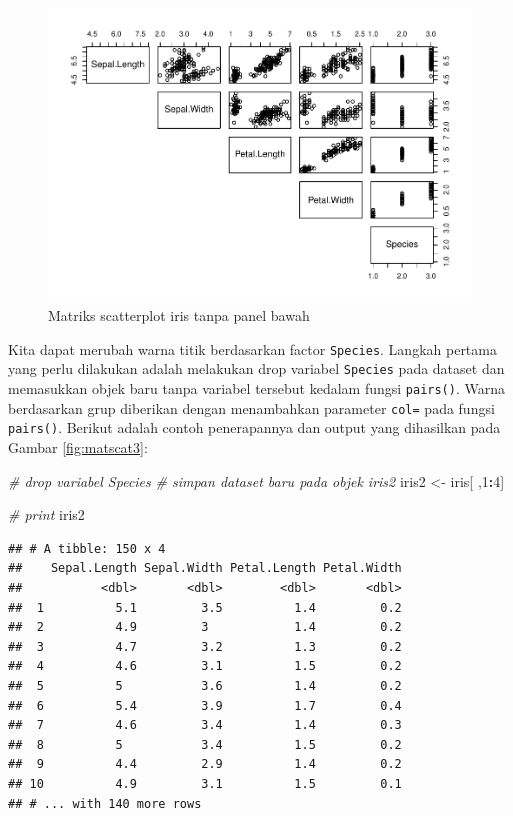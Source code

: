 \documentclass[]{book}
\newenvironment{Shaded}{\begin{snugshade}}{\end{snugshade}}
\newcommand{\DecValTok}[1]{\textcolor[rgb]{0.00,0.00,0.81}{#1}}
\newcommand{\StringTok}[1]{\textcolor[rgb]{0.31,0.60,0.02}{#1}}
\newcommand{\CommentTok}[1]{\textcolor[rgb]{0.56,0.35,0.01}{\textit{#1}}}
\newcommand{\OperatorTok}[1]{\textcolor[rgb]{0.81,0.36,0.00}{\textbf{#1}}}
\newcommand{\NormalTok}[1]{#1}
\begin{document}
\begin{figure}

{\centering \includegraphics[width=0.8\linewidth]{EnvStat_files/figure-latex/matscat2-1} 

}

\caption{Matriks scatterplot iris tanpa panel bawah}\label{fig:matscat2}
\end{figure}

Kita dapat merubah warna titik berdasarkan factor \texttt{Species}.
Langkah pertama yang perlu dilakukan adalah melakukan drop variabel
\texttt{Species} pada dataset dan memasukkan objek baru tanpa variabel
tersebut kedalam fungsi \texttt{pairs()}. Warna berdasarkan grup
diberikan dengan menambahkan parameter \texttt{col=} pada fungsi
\texttt{pairs()}. Berikut adalah contoh penerapannya dan output yang
dihasilkan pada Gambar \ref{fig:matscat3}:

\begin{Shaded}
\begin{Highlighting}[]
\CommentTok{# drop variabel Species}
\CommentTok{# simpan dataset baru pada objek iris2}
\NormalTok{iris2 <-}\StringTok{ }\NormalTok{iris[ ,}\DecValTok{1}\OperatorTok{:}\DecValTok{4}\NormalTok{]}

\CommentTok{# print}
\NormalTok{iris2}
\end{Highlighting}
\end{Shaded}

\begin{verbatim}
## # A tibble: 150 x 4
##    Sepal.Length Sepal.Width Petal.Length Petal.Width
##           <dbl>       <dbl>        <dbl>       <dbl>
##  1          5.1         3.5          1.4         0.2
##  2          4.9         3            1.4         0.2
##  3          4.7         3.2          1.3         0.2
##  4          4.6         3.1          1.5         0.2
##  5          5           3.6          1.4         0.2
##  6          5.4         3.9          1.7         0.4
##  7          4.6         3.4          1.4         0.3
##  8          5           3.4          1.5         0.2
##  9          4.4         2.9          1.4         0.2
## 10          4.9         3.1          1.5         0.1
## # ... with 140 more rows
\end{verbatim}
\end{document}
